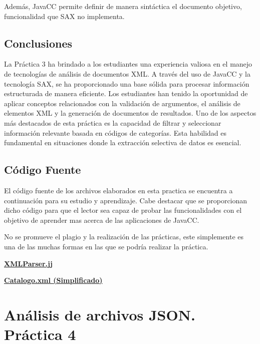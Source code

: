 Además, JavaCC permite definir de manera sintáctica el documento objetivo, funcionalidad que SAX no implementa.

\subsection{Conclusiones}

\noindent La Práctica 3 ha brindado a los estudiantes una experiencia valiosa en el manejo de tecnologías de análisis de documentos XML. A través del uso de JavaCC y la tecnología SAX, se ha proporcionado una base sólida para procesar información estructurada de manera eficiente. Los estudiantes han tenido la oportunidad de aplicar conceptos relacionados con la validación de argumentos, el análisis de elementos XML y la generación de documentos de resultados.
Uno de los aspectos más destacados de esta práctica es la capacidad de filtrar y seleccionar información relevante basada en códigos de categorías. Esta habilidad es fundamental en situaciones donde la extracción selectiva de datos es esencial.


\subsection{Código Fuente}
\label{sec:codigofuentep3}

\noindent El código fuente de los archivos elaborados en esta practica se encuentra a continuación para su estudio y aprendizaje. Cabe destacar que se proporcionan dicho código para que el lector sea capaz de probar las funcionalidades con el objetivo de aprender mas acerca de las aplicaciones de JavaCC.

No se promueve el plagio y la realización de las prácticas, este simplemente es una de las muchas formas en las que se podría realizar la práctica.

\hyperref[sec:XMLParser]{\textbf{XMLParser.jj}}

\hyperref[sec:catalogoxml]{\textbf{Catalogo.xml (Simplificado)}}

\section{Análisis de archivos JSON. Práctica 4}


